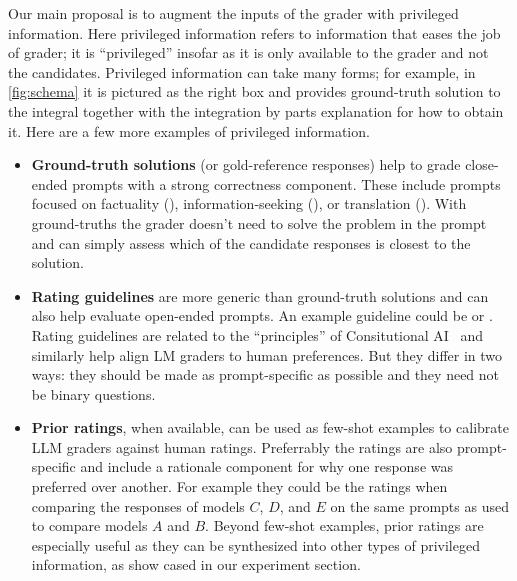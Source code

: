 Our main proposal is to augment the inputs of the grader with privileged information.
Here privileged information refers to information that eases the job of grader; it is ``privileged'' insofar as it is only available to the grader and not the candidates.
Privileged information can take many forms; for example, in \cref{fig:schema} it is pictured as the right box and provides ground-truth solution to the integral together with the integration by parts explanation for how to obtain it.
Here are a few more examples of privileged information.
%
\begin{itemize}
    \item \textbf{Ground-truth solutions} (or gold-reference responses) help to grade close-ended prompts with a strong correctness component.
    These include prompts focused on factuality (), information-seeking (), or translation ().
    With ground-truths the grader doesn't need to solve the problem in the prompt and can simply assess which of the candidate responses is closest to the solution.

    \item \textbf{Rating guidelines} are more generic than ground-truth solutions and can also help evaluate open-ended prompts.
    An example guideline could be  or .
    Rating guidelines are related to the ``principles'' of Consitutional AI~\citep{Bai2022-uh} and similarly help align LM graders to human preferences.
    But they differ in two ways: they should be made as prompt-specific as possible and they need not be binary questions.

    \item \textbf{Prior ratings}, when available, can be used as few-shot examples to calibrate LLM graders against human ratings.
    Preferrably the ratings are also prompt-specific and include a rationale component for why one response was preferred over another.
    For example they could be the ratings when comparing the responses of models $C$, $D$, and $E$ on the same prompts as used to compare models $A$ and $B$.
    Beyond few-shot examples, prior ratings are especially useful as they can be synthesized into other types of privileged information, as show cased in our experiment section.


\end{itemize}
